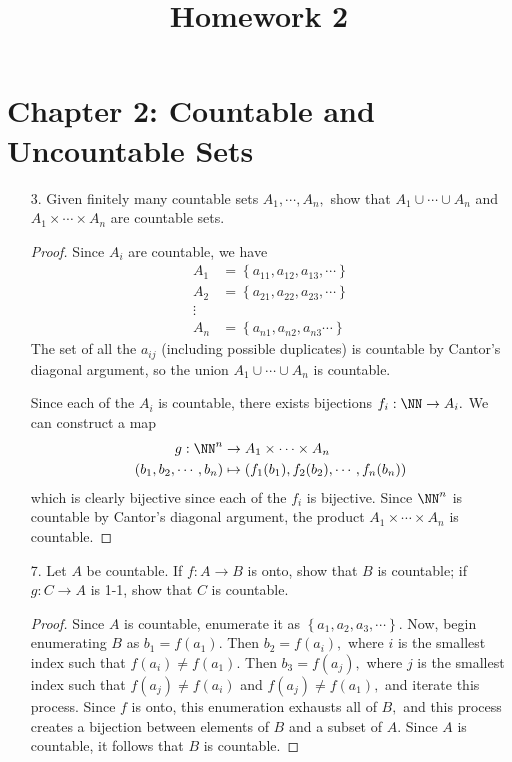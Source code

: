 \documentclass{article}
\begin{document}
\title{Homework 2}
\maketitle
\thispagestyle{fancy}

\section*{Chapter 2: Countable and Uncountable Sets}

\begin{itemize}
	\item[3.] Given finitely many countable sets $A_1, \cdots, A_n,$ show that $A_1\cup\cdots\cup A_n$ and $A_1\times\cdots\times A_n$ are countable sets.
		\begin{proof}
			Since $A_i$ are countable, we have
			\begin{align*}
				A_1 &= \left\{ a_{11}, a_{12}, a_{13}, \cdots \right\} \\
				A_2 &= \left\{ a_{21}, a_{22}, a_{23}, \cdots \right\} \\
				\vdots \\
				A_n &= \left\{ a_{n1}, a_{n2}, a_{n3}\cdots \right\}
			\end{align*}
			The set of all the $a_{ij}$ (including possible duplicates) is countable by Cantor's diagonal argument, so the union $A_1\cup\cdots\cup A_n$ is countable.

			Since each of the $A_i$ is countable, there exists bijections $f_i:\NN\to A_i.$ We can construct a map 
			\begin{align*}
				g:\NN^n &\to A_1\times\cdots\times A_n \\
				(b_1, b_2, \cdots, b_n) &\mapsto (f_1(b_1), f_2(b_2), \cdots, f_n(b_n))
			\end{align*}
			which is clearly bijective since each of the $f_i$ is bijective. Since $\NN^n$ is countable by Cantor's diagonal argument, the product $A_1\times\cdots\times A_n$ is countable.
		\end{proof}

	\item[7.] Let $A$ be countable. If $f:A\to B$ is onto, show that $B$ is countable; if $g:C\to A$ is 1-1, show that $C$ is countable.
		\begin{proof}
			Since $A$ is countable, enumerate it as $\left\{ a_1, a_2, a_3, \cdots \right\}.$ Now, begin enumerating $B$ as $b_1=f(a_1).$ Then $b_2=f(a_i),$ where $i$ is the smallest index such that $f(a_i)\neq f(a_1).$ Then $b_3=f(a_j),$ where $j$ is the smallest index such that $f(a_j)\neq f(a_i)$ and $f(a_j)\neq f(a_1),$ and iterate this process. Since $f$ is onto, this enumeration exhausts all of $B,$ and this process creates a bijection between elements of $B$ and a subset of $A.$ Since $A$ is countable, it follows that $B$ is countable.


\end{proof}
\end{itemize}
\end{document}
